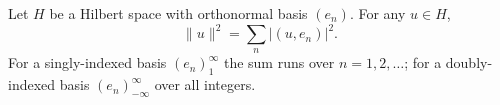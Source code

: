 Let $H$ be a Hilbert space with orthonormal basis $(e_n)$. For any $u \in H$,
$$\|u\|^2 = \sum_{n} |(u, e_n)|^2.$$
For a singly-indexed basis $(e_n)_{1}^{\infty}$ the sum runs over $n = 1, 2, \ldots$; for a doubly-indexed basis $(e_n)_{-\infty}^{\infty}$ over all integers.
